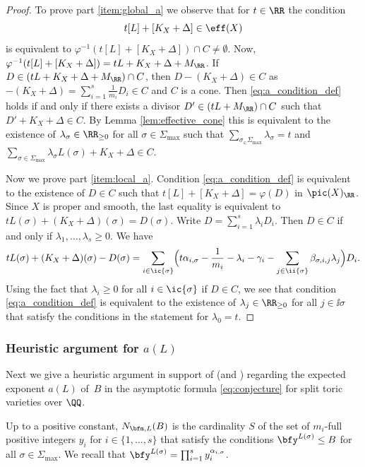 \begin{proof}
To prove part \eqref{item:global_a} we observe that for $t\in\RR$ the condition
\begin{equation}
\label{eq:a_condition_def}
t[L]+[K_X+\Delta] \in \eff(X)
\end{equation}
is equivalent to $\varphi^{-1}(t[L]+[K_X+\Delta])\cap C\neq\emptyset$.
Now, $\varphi^{-1}(t[L]+[K_X+\Delta])=tL+K_X+\Delta+M_\RR$.
If $D\in (tL+K_X+\Delta+M_\RR)\cap C$, then $D-(K_X+\Delta)\in C$ as
$-(K_X+\Delta)=\sum_{i=1}^s\frac 1{m_i}D_i\in C$ and $C$ is a cone.
Then \eqref{eq:a_condition_def} holds if and only if there exists a divisor
$D'\in (tL+M_\RR)\cap C$ such that $D'+K_X+\Delta\in C$.
By Lemma \ref{lem:effective_cone} this is equivalent to the existence of
$\lambda_\sigma\in\RR_{\geq0}$ for all $\sigma\in\Sigma_{\max}$ such that
$\sum_{\sigma_\in\Sigma_{\max}}\lambda_\sigma=t$ and
$\sum_{\sigma\in\Sigma_{\max}}\lambda_\sigma L(\sigma)+K_X+\Delta\in C$.

Now we prove part \eqref{item:local_a}. Condition \eqref{eq:a_condition_def} is
equivalent to the existence of $D\in C$ such that $t[L]+[K_X+\Delta]=\varphi(D)$ in
$\pic(X)_\RR$. Since $X$ is proper and smooth, the last equality is
equivalent to $tL(\sigma)+(K_X+\Delta)(\sigma)=D(\sigma)$.
Write $D=\sum_{i=1}^s\lambda_i D_i$.
Then $D\in C$ if and only if $\lambda_1,\dots,\lambda_s\geq0$.
We have
\[
tL(\sigma)+(K_X+\Delta)(\sigma)-D(\sigma)
=\sum_{i\in\ic{\sigma}}\Bigl(t \alpha_{i,\sigma} -\frac 1{m_i}-\lambda_{i}-\gamma_i
-\sum_{j\in \ii{\sigma}}\beta_{\sigma,i,j}\lambda_j\Bigr)D_{i}.
\]
Using the fact that $\lambda_{i}\geq0$ for all $i\in\ic{\sigma}$ if $D\in C$,
we see that condition \eqref{eq:a_condition_def} is equivalent to the existence of
$\lambda_j\in\RR_{\geq0}$ for all $j\in\ii{\sigma}$ that satisfy the conditions in
the statement for $\lambda_0=t$.
\end{proof}

\subsubsection{Heuristic argument for $a(L)$}
Next we give a heuristic argument in support of \cite[Conj.\,1.1]{PSTVA}
(and \cite[\S3.3]{MR1032922})
regarding the expected exponent $a(L)$ of~$B$ in the asymptotic
formula \eqref{eq:conjecture} for split toric varieties over $\QQ$.

Up to a positive constant, $N_{\bfm,L}(B)$ is the cardinality $S$ of the set of $m_i$-full positive integers $y_i$ for $i\in\{1,\dots,s\}$ that satisfy the conditions $\bfy^{L(\sigma)}\leq B$ for all $\sigma\in\Sigma_{\max}$. We recall that $\bfy^{L(\sigma)}=\prod_{i=1}^s y_i^{\alpha_{i,\sigma}}$.

